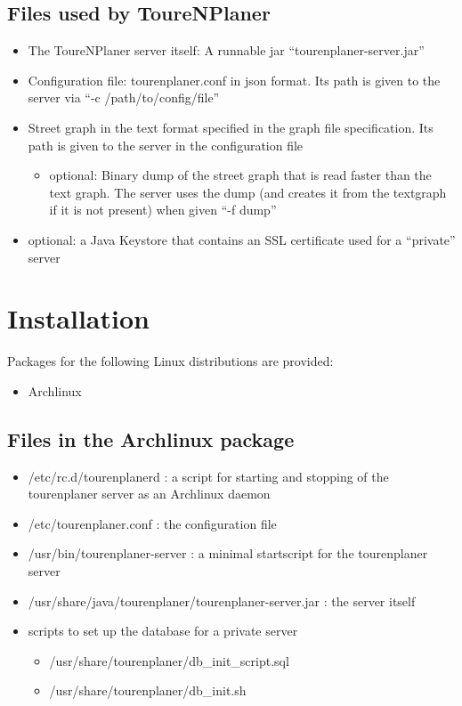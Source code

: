 \documentclass[ngerman,titlepage,parskip=true]{scrartcl}
\begin{document}
	\label{usedfiles}
  \subsection{Files used by ToureNPlaner}
	 \begin{itemize}
	   \item The ToureNPlaner server itself: A runnable jar ``tourenplaner-server.jar''
	   \item Configuration file: tourenplaner.conf in json format. Its path is given to the server via ``-c /path/to/config/file''
	   \item Street graph in the text format specified in the graph file specification. Its path is given to the server in the configuration file
		\begin{itemize}
		  \item optional: Binary dump of the street graph that is read faster than the text graph. The server uses the dump (and creates it from the textgraph if it is not present) when given ``-f dump''
		\end{itemize}
	   \item optional: a Java Keystore that contains an SSL certificate used for a ``private'' server
	 \end{itemize}

\section{Installation}
  Packages for the following Linux distributions are provided:
  \begin{itemize}
    \item Archlinux
  \end{itemize}
  \subsection{Files in the Archlinux package}
	\begin{itemize}
	  \item /etc/rc.d/tourenplanerd : a script for starting and stopping of the tourenplaner server as an Archlinux daemon
	  \item /etc/tourenplaner.conf : the configuration file
	  \item /usr/bin/tourenplaner-server : a minimal startscript for the tourenplaner server
	  \item /usr/share/java/tourenplaner/tourenplaner-server.jar : the server itself
	  \item scripts to set up the database for a private server
		\begin{itemize}
		  \item /usr/share/tourenplaner/db\_init\_script.sql
		  \item /usr/share/tourenplaner/db\_init.sh
		\end{itemize}
	\end{itemize}
\end{document}
